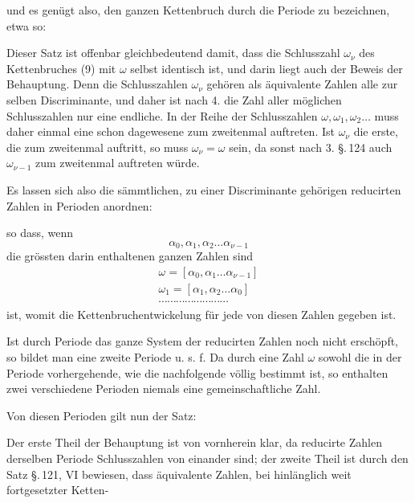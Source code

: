 
und es genügt also, den ganzen Kettenbruch durch die Periode zu bezeichnen, etwa so:


Dieser Satz ist offenbar gleichbedeutend damit, dass die Schlusszahl $\omega_\nu$ des Kettenbruches (9) mit $\omega$ selbst identisch ist, und darin liegt auch der Beweis der Behauptung. Denn die Schlusszahlen $\omega_\nu$ gehören als äquivalente Zahlen alle zur selben Discriminante, und daher ist nach 4. die Zahl aller möglichen Schlusszahlen nur eine endliche. In der Reihe der Schlusszahlen $\omega, \omega_1, \omega_2 \ldots$ muss daher einmal eine schon dagewesene zum zweitenmal auftreten. Ist $\omega_\nu$ die erste, die zum zweitenmal auftritt, so muss $\omega_\nu = \omega$ sein, da sonst nach 3. \S.\,124 auch $\omega_{\nu-1}$ zum zweitenmal auftreten würde.

Es lassen sich also die sämmtlichen, zu einer Discriminante gehörigen reducirten Zahlen in Perioden anordnen:


so dass, wenn
\[
\alpha_0, \alpha_1, \alpha_2 \ldots \alpha_{\nu-1}
\]
die grössten darin enthaltenen ganzen Zahlen sind
\[
\begin{array}{l}
\omega = [\alpha_0, \alpha_1 \ldots \alpha_{\nu-1}]\\
\omega_1 = [\alpha_1, \alpha_2 \ldots \alpha_0]\\
\cdots\cdots\cdots\cdots\cdots\cdots\cdots\cdots
\end{array}
\]
ist, womit die Kettenbruchentwickelung für jede von diesen Zahlen gegeben ist.

Ist durch  Periode das ganze System der reducirten Zahlen noch nicht erschöpft, so bildet man eine zweite Periode u. s. f. Da durch eine Zahl $\omega$ sowohl die in der Periode vorhergehende, wie die nachfolgende völlig bestimmt ist, so enthalten zwei verschiedene Perioden niemals eine gemeinschaftliche Zahl.

Von diesen Perioden gilt nun der Satz:


Der erste Theil der Behauptung ist von vornherein klar, da reducirte Zahlen derselben Periode Schlusszahlen von einander sind; der zweite Theil ist durch den Satz \S.\,121, VI bewiesen, dass äquivalente Zahlen, bei hinlänglich weit fortgesetzter Ketten-
